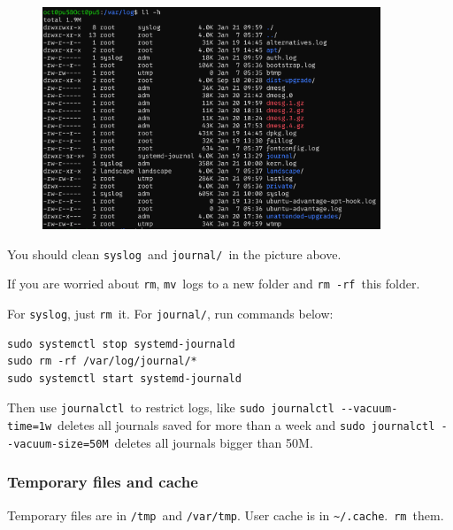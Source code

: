 \documentclass[12pt]{ctexart}
\newenvironment{mdquote}
{%
  \par\noindent
  \begin{list}{}{%
      \setlength{\leftmargin}{1em}%
      \setlength{\rightmargin}{0pt}%
      \setlength{\itemindent}{0pt}%
      \setlength{\listparindent}{\parindent}%
      \setlength{\topsep}{0.5\baselineskip}%
  }
  \item[\textbf{>}\ ]\itshape
}
{\end{list}\par}
\begin{document}
\begin{figure}[H]
    \centering
    \includegraphics[width=0.9\textwidth,keepaspectratio]{assets/Linux/2.4 No, the C drive is almost full!/1.png}
\end{figure}

You should clean \texttt{syslog}\ and \texttt{journal/}\ in the picture
above.

\begin{mdquote}
If you are worried about \texttt{rm}, \texttt{mv}\ logs to a new folder
and \texttt{rm\ -rf}\ this folder.
\end{mdquote}

For \texttt{syslog}, just \texttt{rm}\ it. For \texttt{journal/}, run
commands below:

\begin{adjustwidth}{2em}{0pt}
\begin{verbatim}
sudo systemctl stop systemd-journald
sudo rm -rf /var/log/journal/*
sudo systemctl start systemd-journald
\end{verbatim}
\end{adjustwidth}

Then use \texttt{journalctl}\ to restrict logs, like
\texttt{sudo\ journalctl\ -\/-vacuum-time=1w}\ deletes all journals saved
for more than a week and \texttt{sudo\ journalctl\ -\/-vacuum-size=50M}\
deletes all journals bigger than 50M.

\subsubsection*{\textbf{Temporary files and cache}}

Temporary files are in \texttt{/tmp}\ and \texttt{/var/tmp}. User cache
is in \texttt{\textasciitilde{}/.cache}.\ \texttt{rm}\ them.
\end{document}
